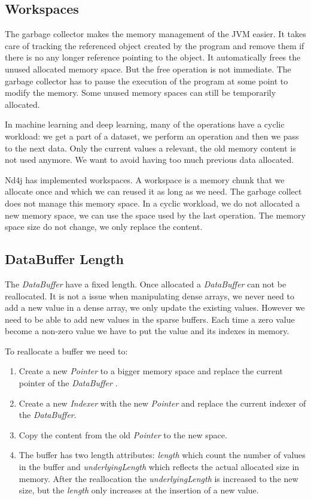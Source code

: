 \subsection{Workspaces}

The garbage collector makes the memory management of the JVM easier. It takes care of tracking the referenced object created by the program and remove them if there is no any longer reference pointing to the object. It automatically frees the unused allocated memory space. But the free operation is not immediate. The garbage collector has to pause the execution of the program at some point to modify the memory. Some unused memory spaces can still be temporarily allocated.

In machine learning and deep learning, many of the operations have a cyclic workload: we get a part of a dataset, we perform an operation and then we pass to the next data. Only the current values a relevant, the old memory content is not  used anymore. We want to avoid having too much previous data allocated.

Nd4j has implemented workspaces. A workspace is a memory chunk that we allocate once and which we can reused it as long as we need. The garbage collect does not manage this memory space. In a cyclic workload, we do not allocated a new memory space, we can use the space used by the last operation. The memory space size do not change, we only replace the content.



\subsection{DataBuffer Length}

The \textit{DataBuffer} have a fixed length. Once allocated a \textit{DataBuffer} can not be reallocated. It is not a issue when manipulating dense arrays, we never need to add a new value in a dense array, we only update the existing values. However we need to be able to add new values in the sparse buffers. Each time a zero value become a non-zero value we have to put the value and its indexes in memory.

To reallocate a buffer we need to:
\begin{enumerate}
	\item Create a new \textit{Pointer} to a bigger memory space and replace the current pointer of the \textit{DataBuffer} .
	\item Create a new \textit{Indexer} with the new \textit{Pointer} and replace the current indexer of the \textit{DataBuffer}.
	\item Copy the content from the old \textit{Pointer} to the new space.
	\item The buffer has two length attributes: \textit{length} which count the number of values in the buffer and \textit{underlyingLength} which reflects the actual allocated size in memory. After the reallocation the \textit{underlyingLength} is increased to the new size, but the \textit{length} only increases at the insertion of a new value.
\end{enumerate}

